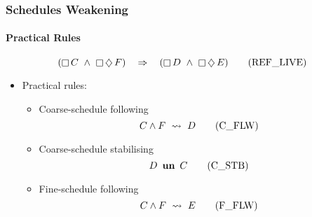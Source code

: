 \begin{frame}
  \frametitle{Schedules Weakening}
  \framesubtitle{Practical Rules}

  
  \begin{equation}
    (\mathop{\square} C ~\land~ \mathop{\square}
    \mathop{\diamondsuit} F) ~~~\mathbin\Rightarrow~~~ (\mathop{\square} D ~\land~
    \mathop{\square} \mathop{\diamondsuit} E)\label{eq:ref-live}
    \tag{REF\_LIVE}
  \end{equation}
  \begin{itemize}
  \item<2-> \alert{Practical} rules:
    \medskip
    \begin{itemize}
    \item Coarse-schedule following
      \begin{equation}
        \label{eq:csched-weakening}
        C \land F ~\leadsto~ D
        \tag{C\_FLW}
      \end{equation}
    \item Coarse-schedule stabilising
      \begin{equation}
        \label{eq:csched-stable}
        D ~\mathop{\textbf{un}}~ C
        \tag{C\_STB}
      \end{equation}
    \item Fine-schedule following
      \begin{equation}
        \label{eq:fsched-weakening}
        C \land F ~\leadsto~ E
        \tag{F\_FLW}
      \end{equation}
    \end{itemize}
  \end{itemize}
\end{frame}


  

